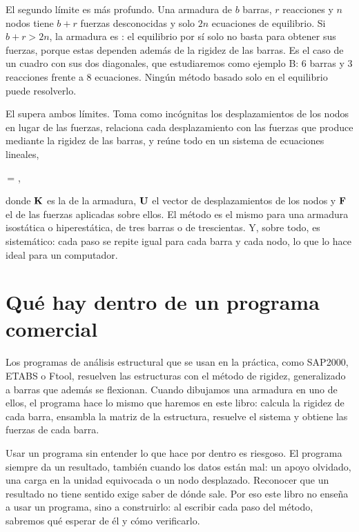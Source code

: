 El segundo límite es más profundo. Una armadura de $b$ barras, $r$
reacciones y $n$ nodos tiene $b + r$ fuerzas desconocidas y solo $2n$
ecuaciones de equilibrio. Si $b + r > 2n$, la armadura es
: el equilibrio por sí solo
no basta para obtener sus fuerzas, porque estas dependen además de la
rigidez de las barras. Es el caso de un cuadro con sus dos diagonales, que
estudiaremos como ejemplo B: 6 barras y 3 reacciones frente a 8 ecuaciones.
Ningún método basado solo en el equilibrio puede resolverlo.

El  supera ambos límites. Toma
como incógnitas los desplazamientos de los nodos en lugar de las fuerzas,
relaciona cada desplazamiento con las fuerzas que produce mediante la rigidez
de las barras, y reúne todo en un sistema de ecuaciones lineales,
\begin{ecuacionclave}
  \mK\,\vU = \vF,
\end{ecuacionclave}
donde $\mathbf{K}$ es la  de la
armadura, $\mathbf{U}$ el vector de desplazamientos de los nodos y $\mathbf{F}$ el de las
fuerzas aplicadas sobre ellos. El método es el mismo para una armadura
isostática o hiperestática, de tres barras o de trescientas. Y, sobre todo,
es sistemático: cada paso se repite igual para cada barra y cada nodo, lo
que lo hace ideal para un computador.

\section{Qué hay dentro de un programa comercial}\label{sec:programas}

Los programas de análisis estructural que se usan en la práctica, como
SAP2000, ETABS o Ftool, resuelven las estructuras con el método de rigidez,
generalizado a barras que además se flexionan. Cuando dibujamos una armadura
en uno de ellos, el programa hace lo mismo que haremos en este libro: calcula
la rigidez de cada barra, ensambla la matriz de la estructura, resuelve el
sistema y obtiene las fuerzas de cada barra.

Usar un programa sin entender lo que hace por dentro es riesgoso. El programa
siempre da un resultado, también cuando los datos están mal: un apoyo
olvidado, una carga en la unidad equivocada o un nodo desplazado. Reconocer
que un resultado no tiene sentido exige saber de dónde sale. Por eso este
libro no enseña a usar un programa, sino a construirlo: al escribir cada paso
del método, sabremos qué esperar de él y cómo verificarlo.

